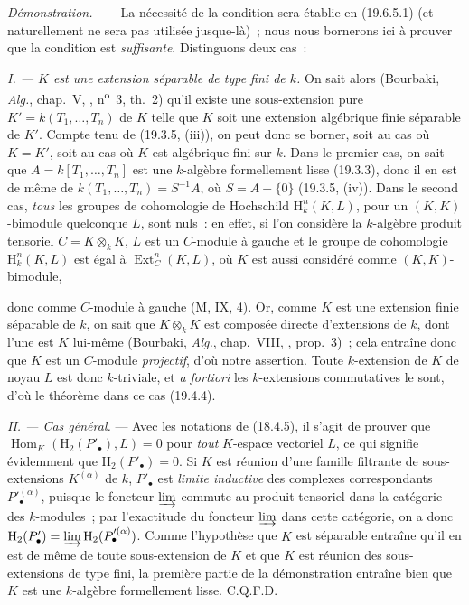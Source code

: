 \documentclass[10pt,oneside]{book}
\newcommand{\oldpage}[2][]{%
  \setcounter{footnote}{0}%
  \marginpar{\scriptsize\textbf{#1}~|~#2}\ignorespaces}
\newenvironment{proof}{%
  \par\medskip\noindent\textit{Démonstration. ---\ }}{\par}
\begin{document}
\begin{proof}
La nécessité de la condition sera établie en (19.6.5.1) (et naturellement ne
sera pas utilisée jusque-là)~; nous nous bornerons ici à prouver que la
condition est \emph{suffisante}. Distinguons deux cas~:

\emph{I. --- $K$ est une extension séparable de type fini de $k$.} On sait
alors (Bourbaki, \emph{Alg.}, chap.~V, ,
n\textsuperscript{o}~3, th.~2) qu'il existe une sous-extension pure
$K'=k(T_1,\ldots,T_n)$ de $K$ telle que $K$ soit une extension algébrique
finie séparable de $K'$. Compte tenu de (19.3.5, (iii)), on peut donc se
borner, soit au cas où $K=K'$, soit au cas où $K$ est algébrique fini sur $k$.
Dans le premier cas, on sait que $A=k[T_1,\ldots,T_n]$ est une $k$-algèbre
formellement lisse (19.3.3), donc il en est de même de
$k(T_1,\ldots,T_n)=S^{-1}A$, où $S=A-\{0\}$ (19.3.5, (iv)). Dans le second
cas, \emph{tous} les groupes de cohomologie de Hochschild
$\mathrm H_k^n(K,L)$, pour un $(K,K)$-bimodule quelconque $L$, sont nuls~: en
effet, si l'on considère la $k$-algèbre produit tensoriel $C=K\otimes_k K$,
$L$ est un $C$-module à gauche et le groupe de cohomologie
$\mathrm H_k^n(K,L)$ est égal à $\operatorname{Ext}_C^n(K,L)$, où $K$ est
aussi considéré comme $(K,K)$-bimodule,

\oldpage[0\textsubscript{IV-1}]{101}

donc comme $C$-module à gauche (M, IX, 4). Or, comme $K$ est une extension
finie séparable de $k$, on sait que $K\otimes_k K$ est composée directe
d'extensions de $k$, dont l'une est $K$ lui-même (Bourbaki, \emph{Alg.},
chap.~VIII, , prop.~3)~; cela entraîne donc que $K$ est un
$C$-module \emph{projectif}, d'où notre assertion. Toute $k$-extension de $K$
de noyau $L$ est donc $k$-triviale, et \emph{a fortiori} les $k$-extensions
commutatives le sont, d'où le théorème dans ce cas (19.4.4).

\emph{II. --- Cas général.} --- Avec les notations de (18.4.5), il s'agit de
prouver que $\operatorname{Hom}_K(\mathrm H_2(P'_\bullet),L)=0$ pour
\emph{tout} $K$-espace vectoriel $L$, ce qui signifie évidemment que
$\mathrm H_2(P'_\bullet)=0$. Si $K$ est réunion d'une famille filtrante de
sous-extensions $K^{(\alpha)}$ de $k$, $P'_\bullet$ est \emph{limite
inductive} des complexes correspondants $P'^{(\alpha)}_\bullet$, puisque le
foncteur $\varinjlim$ commute au produit tensoriel dans la catégorie des
$k$-modules~; par l'exactitude du foncteur $\varinjlim$ dans cette catégorie,
on a donc
$\mathrm H_2(P'_\bullet)=\varinjlim\mathrm H_2(P'^{(\alpha)}_\bullet)$.
Comme l'hypothèse que $K$ est séparable entraîne qu'il en est de même de toute
sous-extension de $K$ et que $K$ est réunion des sous-extensions de type fini,
la première partie de la démonstration entraîne bien que $K$ est une
$k$-algèbre formellement lisse. C.Q.F.D.
\end{proof}
\end{document}
